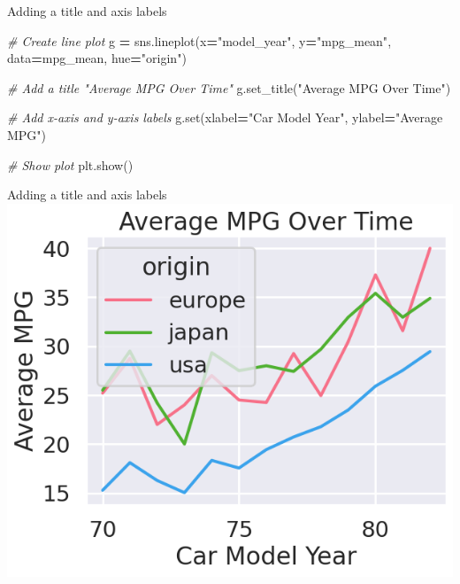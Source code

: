 \documentclass[
  ignorenonframetext,
]{beamer}
\newenvironment{Shaded}{\begin{snugshade}}{\end{snugshade}}
\newcommand{\BuiltInTok}[1]{#1}
\newcommand{\CommentTok}[1]{\textcolor[rgb]{0.56,0.35,0.01}{\textit{#1}}}
\newcommand{\NormalTok}[1]{#1}
\newcommand{\OperatorTok}[1]{\textcolor[rgb]{0.81,0.36,0.00}{\textbf{#1}}}
\newcommand{\StringTok}[1]{\textcolor[rgb]{0.31,0.60,0.02}{#1}}
\begin{document}
\begin{frame}[fragile]{Adding a title and axis labels}
\label{adding-a-title-and-axis-labels-5}

\begin{Shaded}
\begin{Highlighting}[]
\CommentTok{\# Create line plot}
\NormalTok{g }\OperatorTok{=}\NormalTok{ sns.lineplot(x}\OperatorTok{=}\StringTok{"model\_year"}\NormalTok{, y}\OperatorTok{=}\StringTok{"mpg\_mean"}\NormalTok{, }
\NormalTok{                 data}\OperatorTok{=}\NormalTok{mpg\_mean,}
\NormalTok{                 hue}\OperatorTok{=}\StringTok{"origin"}\NormalTok{)}

\CommentTok{\# Add a title "Average MPG Over Time"}
\NormalTok{g.set\_title(}\StringTok{"Average MPG Over Time"}\NormalTok{)}

\CommentTok{\# Add x{-}axis and y{-}axis labels}
\NormalTok{g.}\BuiltInTok{set}\NormalTok{(xlabel}\OperatorTok{=}\StringTok{"Car Model Year"}\NormalTok{, }
\NormalTok{      ylabel}\OperatorTok{=}\StringTok{"Average MPG"}\NormalTok{)}

\CommentTok{\# Show plot}
\NormalTok{plt.show()}
\end{Highlighting}
\end{Shaded}
\end{frame}

\begin{frame}{Adding a title and axis labels}
\label{adding-a-title-and-axis-labels-6}
\includegraphics{../images/im307.png}
\end{frame}
\end{document}
